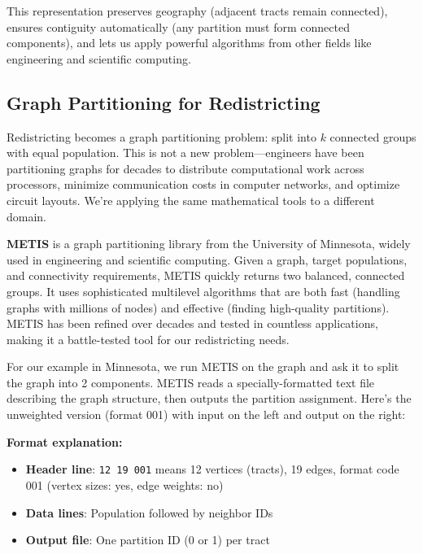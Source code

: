 \documentclass[11pt]{article}
\begin{document}
This representation preserves geography (adjacent tracts remain connected), ensures contiguity automatically (any partition must form connected components), and lets us apply powerful algorithms from other fields like engineering and scientific computing. 

\subsection{Graph Partitioning for Redistricting}

Redistricting becomes a graph partitioning problem: split into $k$ connected groups with equal population. This is not a new problem—engineers have been partitioning graphs for decades to distribute computational work across processors, minimize communication costs in computer networks, and optimize circuit layouts. We're applying the same mathematical tools to a different domain.

\textbf{METIS} is a graph partitioning library from the University of Minnesota, widely used in engineering and scientific computing. Given a graph, target populations, and connectivity requirements, METIS quickly returns two balanced, connected groups. It uses sophisticated multilevel algorithms that are both fast (handling graphs with millions of nodes) and effective (finding high-quality partitions). METIS has been refined over decades and tested in countless applications, making it a battle-tested tool for our redistricting needs.

For our example in Minnesota, we run METIS on the graph and ask it to split the graph into 2 components. METIS reads a specially-formatted text file describing the graph structure, then outputs the partition assignment. Here's the unweighted version (format 001) with input on the left and output on the right:

\textbf{Format explanation:}
\begin{itemize}[noitemsep,topsep=0pt]
\item \textbf{Header line}: \texttt{12 19 001} means 12 vertices (tracts), 19 edges, format code 001 (vertex sizes: yes, edge weights: no)
\item \textbf{Data lines}: Population followed by neighbor IDs
\item \textbf{Output file}: One partition ID (0 or 1) per tract
\end{itemize}
\end{document}
